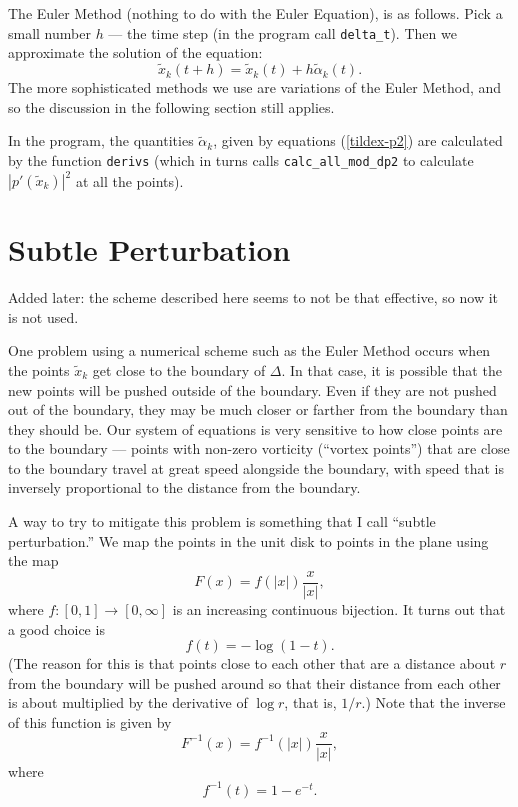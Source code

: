 \documentclass[12pt]{article}
\begin{document}
The Euler Method
(nothing to do with the Euler Equation), is as
follows.  Pick a small number $h$ --- the time step (in
the program call {\tt delta\_t}).  Then we approximate
the solution of the equation:
\begin{equation}
\label{method-simple}
\tilde x_k(t+h) = \tilde x_k(t) + h \tilde\alpha_k(t) .
\end{equation}
The more sophisticated methods we use are variations of 
the Euler Method, and so the discussion in the following section
still applies.

In the program, the quantities $\tilde\alpha_k$, given by
equations (\ref{tildex-p2}) are calculated by the function
{\tt derivs}
(which in turns calls {\tt calc\_all\_mod\_dp2} to
calculate $|p'(\tilde x_k)|^2$ at all the points).


\section{Subtle Perturbation}

Added later: the scheme described here seems to not be that effective,
so now it is not used.

One problem using a numerical scheme such as the Euler Method occurs
when the points $\tilde x_k$ get close to the boundary
of $\Delta$.  In that case, it is possible that the new
points will be pushed outside of the boundary.  Even if they 
are not pushed out of the boundary, they may be much closer
or farther from the boundary than they should be.  
Our system of equations is very sensitive to how close points
are to the boundary --- points with non-zero vorticity
(``vortex points'') that are close to the boundary travel
at great speed alongside the boundary, with speed that is
inversely proportional to the distance from the boundary.

A way to try to mitigate this problem is something that I call
``subtle perturbation.''
We map the points in 
the unit disk to points in the plane using the map
\begin{equation*}
F(x) = f(|x|) \frac x{|x|} ,
\end{equation*}
where $f:[0,1]\to[0,\infty]$ is an increasing continuous
bijection.  It turns out that a good choice is
\begin{equation*}
f(t) = -\log(1-t) .
\end{equation*}
(The reason for this is that points close to each other 
that are a distance
about $r$ from the boundary will be pushed around so that
their distance from each other is about multiplied by the
derivative of $\log r$, that is, $1/r$.)
Note that the inverse of this function is given by
\begin{equation*}
F^{-1}(x) = f^{-1}(|x|) \frac x{|x|} ,
\end{equation*}
where 
\begin{equation*}
f^{-1}(t) = 1-e^{-t} .
\end{equation*}
\end{document}
